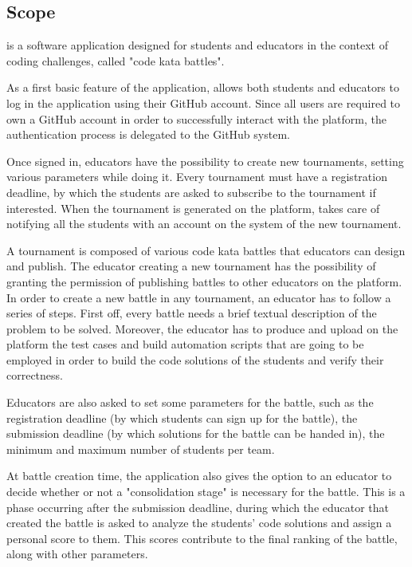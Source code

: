 \subsection{Scope}
	\app is a software application designed for students and educators in the context of coding challenges, called "code kata battles".
	
	As a first basic feature of the application, \app allows both students and educators to log in the application using their GitHub account. Since all users are required to own a GitHub account in order to successfully interact with the \app platform, the authentication process is delegated to the GitHub system.
	
	Once signed in, educators have the possibility to create new tournaments, setting various parameters while doing it. Every tournament must have a registration deadline, by which the students are asked to subscribe to the tournament if interested. When the tournament is generated on the platform, \app takes care of notifying all the students with an account on the system of the new tournament.
	
	A tournament is composed of various code kata battles that educators can design and publish. The educator creating a new tournament has the possibility of granting the permission of publishing battles to other educators on the platform.
	In order to create a new battle in any tournament, an educator has to follow a series of steps. First off, every battle needs a brief textual description of the problem to be solved. Moreover, the educator has to produce and upload on the platform the test cases and build automation scripts that are going to be employed in order to build the code solutions of the students and verify their correctness.

	Educators are also asked to set some parameters for the battle, such as the registration deadline (by which students can sign up for the battle), the submission deadline (by which solutions for the battle can be handed in), the minimum and maximum number of students per team.
	
	At battle creation time, the application also gives the option to an educator to decide whether or not a "consolidation stage" is necessary for the battle. This is a phase occurring after the submission deadline, during which the educator that created the battle is asked to analyze the students' code solutions and assign a personal score to them. This scores contribute to the final ranking of the battle, along with other parameters. 
	
